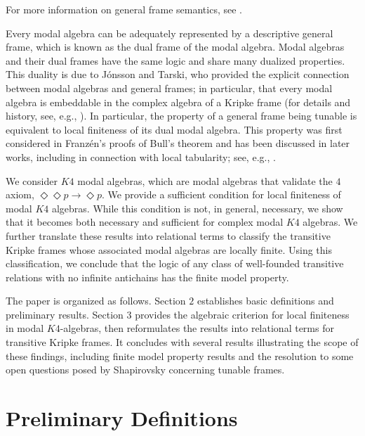 \documentclass[submission]{eptcs}
\begin{document}
For more information on general frame semantics, see \cite{Blackburn_Rijke_Venema_2001}.
\par
Every modal algebra can be adequately represented by a descriptive general frame, which is known as the dual frame of the modal algebra.
Modal algebras and their dual frames have the same logic and share many dualized properties.
This duality is due to Jónsson and Tarski, who provided the explicit connection between modal algebras and general frames; in particular, that every modal algebra is embeddable in the complex algebra of a Kripke frame (for details and history, see, e.g., \cite{Blackburn_Rijke_Venema_2001}).
In particular, the property of a general frame being tunable is equivalent to local finiteness of its dual modal algebra. 
This property was first considered in Franzén's proofs of Bull's theorem \cite{Segerberg_1973} and has been discussed in later works, including in connection with local tabularity; see, e.g., \cite{Shehtmen_2016}.
\par
We consider $K4$ modal algebras, which are modal algebras that validate the $4$ axiom, $\Diamond \Diamond p \to \Diamond p$.
We provide a sufficient condition for local finiteness of modal $K4$ algebras. 
While this condition is not, in general, necessary, we show that it becomes both necessary and sufficient for complex modal $K4$ algebras. 
We further translate these results into relational terms to classify the transitive Kripke frames whose associated modal algebras are locally finite. 
Using this classification, we conclude that the logic of any class of well-founded transitive relations with no infinite antichains has the finite model property.
\par
The paper is organized as follows. 
Section $2$ establishes basic definitions and preliminary results.
Section $3$ provides the algebraic criterion for local finiteness in modal $K4$-algebras, then reformulates the results into relational terms for transitive Kripke frames.
It concludes with several results illustrating the scope of these findings, including finite model property results and the resolution to some open questions posed by Shapirovsky \cite{Shapirovsky_2019} concerning tunable frames.

\section{Preliminary Definitions}
\end{document}
